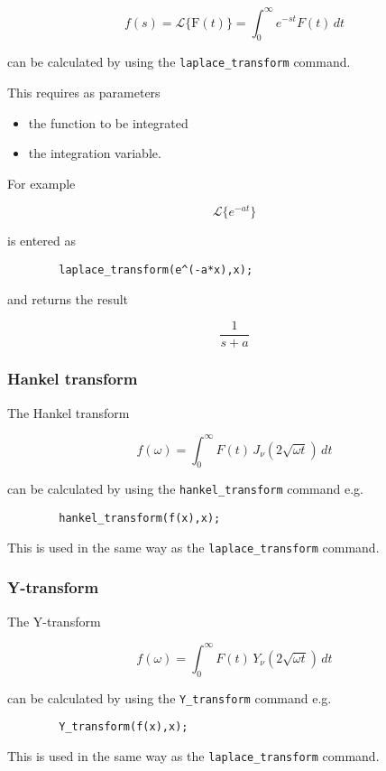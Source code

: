 \[
f(s) = \mathcal{L}\{\mathrm{F}(t)\} = \int_{0}^{\infty} e^{-st}F(t)\,dt
\]

can be calculated by using the \verb+laplace_transform+ command.

This requires as parameters

\begin{itemize}
\item the function to be integrated
\item the integration variable.
\end{itemize}

For example

\[
\mathcal{L}\{e^{-at}\}
\]

is entered as

\begin{verbatim}
        laplace_transform(e^(-a*x),x);
\end{verbatim}

and returns the result

\[
\frac{1}{s+a}
\]

\subsubsection{Hankel transform}

The Hankel transform

\[
f(\omega) = \int_{0}^{\infty} F(t) \,J_{\nu}(2\sqrt{\omega t}) \,dt
\]

can be calculated by using the \verb+hankel_transform+ command e.g.

\begin{verbatim}
        hankel_transform(f(x),x);
\end{verbatim}

This is used in the same way as the \verb+laplace_transform+ command.

\subsubsection{Y-transform}

The Y-transform

\[
f(\omega) = \int_{0}^{\infty} F(t) \,Y_{\nu}(2\sqrt{\omega t}) \,dt
\]

can be calculated by using the \verb+Y_transform+ command e.g.

\begin{verbatim}
        Y_transform(f(x),x);
\end{verbatim}

This is used in the same way as the \verb+laplace_transform+ command.

